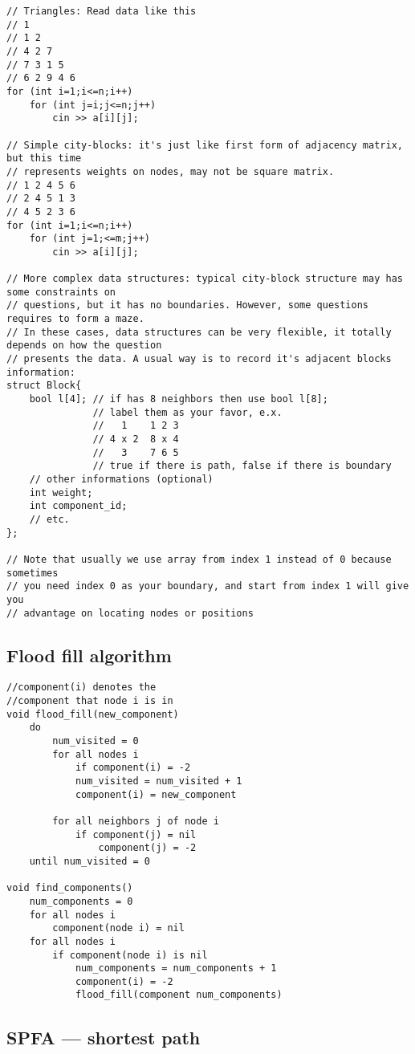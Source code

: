 \documentclass[a4paper]{article}
\begin{document}
\begin{verbatim}
// Triangles: Read data like this
// 1
// 1 2
// 4 2 7
// 7 3 1 5
// 6 2 9 4 6
for (int i=1;i<=n;i++)
	for (int j=i;j<=n;j++)
		cin >> a[i][j];

// Simple city-blocks: it's just like first form of adjacency matrix, but this time
// represents weights on nodes, may not be square matrix.
// 1 2 4 5 6
// 2 4 5 1 3
// 4 5 2 3 6
for (int i=1;i<=n;i++)
	for (int j=1;<=m;j++)
		cin >> a[i][j];
		
// More complex data structures: typical city-block structure may has some constraints on
// questions, but it has no boundaries. However, some questions requires to form a maze.
// In these cases, data structures can be very flexible, it totally depends on how the question
// presents the data. A usual way is to record it's adjacent blocks information:
struct Block{
	bool l[4]; // if has 8 neighbors then use bool l[8];
	           // label them as your favor, e.x.
	           //   1    1 2 3
	           // 4 x 2  8 x 4
	           //   3    7 6 5 
	           // true if there is path, false if there is boundary
	// other informations (optional)
	int weight;
	int component_id;
	// etc.
};
		
// Note that usually we use array from index 1 instead of 0 because sometimes
// you need index 0 as your boundary, and start from index 1 will give you
// advantage on locating nodes or positions
\end{verbatim}

\subsection{Flood fill algorithm}

\begin{verbatim}
//component(i) denotes the
//component that node i is in
void flood_fill(new_component) 
	do
		num_visited = 0
		for all nodes i
			if component(i) = -2
			num_visited = num_visited + 1
			component(i) = new_component
		
		for all neighbors j of node i
			if component(j) = nil
				component(j) = -2
	until num_visited = 0 

void find_components()
	num_components = 0
	for all nodes i
		component(node i) = nil
	for all nodes i
		if component(node i) is nil
			num_components = num_components + 1
			component(i) = -2
			flood_fill(component num_components)
\end{verbatim}

\subsection{SPFA --- shortest path}
\end{document}
